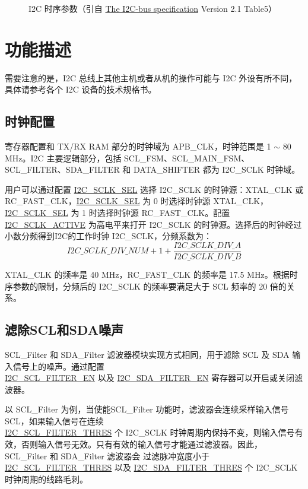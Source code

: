 \documentclass[main\_\_CN.tex]{subfiles}
\begin{document}
\begin{figure}[H]
    \centering
    \caption{I2C 时序参数（引自 \href{https://www.csd.uoc.gr/~hy428/reading/i2c_spec.pdf}{The I2C-bus specification} Version 2.1 Table5）}
    \label{fig:i2c-timing-param}
\end{figure}

\clearpage
\section{功能描述}
需要注意的是，I2C 总线上其他主机或者从机的操作可能与 \chipname{} I2C 外设有所不同，具体请参考各个 I2C 设备的技术规格书。

\subsection{时钟配置}
寄存器配置和 TX/RX RAM 部分的时钟域为 APB\_CLK，时钟范围是 1 $\sim$ 80 MHz。I2C 主要逻辑部分，包括 SCL\_FSM、SCL\_MAIN\_FSM、SCL\_FILTER、SDA\_FILTER 和 DATA\_SHIFTER 都为 I2C\_SCLK 时钟域。

用户可以通过配置 \hyperref[fielddesc:I2CSCLKSEL]{I2C\_SCLK\_SEL} 选择 I2C\_SCLK 的时钟源：XTAL\_CLK 或 RC\_FAST\_CLK，\hyperref[fielddesc:I2CSCLKSEL]{I2C\_SCLK\_SEL} 为 0 时选择时钟源 XTAL\_CLK，\hyperref[fielddesc:I2CSCLKSEL]{I2C\_SCLK\_SEL} 为 1  时选择时钟源 RC\_FAST\_CLK。配置 \hyperref[fielddesc:I2CSCLKACTIVE]{I2C\_SCLK\_ACTIVE} 为高电平来打开 I2C\_SCLK 的时钟源。选择后的时钟经过小数分频得到I2C的工作时钟 I2C\_SCLK，分频系数为：
\[
I2C\_SCLK\_DIV\_ NUM + 1+\frac{ \hyperref[fielddesc:I2CSCLKDIVA]{I2C\_SCLK\_DIV\_A}}{\hyperref[fielddesc:I2CSCLKDIVB]{I2C\_SCLK\_DIV\_B}}
\]

XTAL\_CLK 的频率是 40 MHz，RC\_FAST\_CLK 的频率是 17.5 MHz。根据时序参数的限制，分频后的 I2C\_SCLK 的频率要满足大于 SCL 频率的 20 倍的关系。

\subsection{滤除SCL和SDA噪声}
SCL\_Filter 和 SDA\_Filter 滤波器模块实现方式相同，用于滤除 SCL 及 SDA 输入信号上的噪声。通过配置\\\hyperref[fielddesc:I2CSCLFILTEREN]{I2C\_SCL\_FILTER\_EN} 以及 \hyperref[fielddesc:I2CSDAFILTEREN]{I2C\_SDA\_FILTER\_EN} 寄存器可以开启或关闭滤波器。

以 SCL\_Filter 为例，当使能SCL\_Filter 功能时，滤波器会连续采样输入信号 SCL，如果输入信号在连续 \\\hyperref[fielddesc:I2CSCLFILTERTHRES]{I2C\_SCL\_FILTER\_THRES} 个 I2C\_SCLK 时钟周期内保持不变，则输入信号有效，否则输入信号无效。只有有效的输入信号才能通过滤波器。因此，SCL\_Filter 和 SDA\_Filter 滤波器会
过滤脉冲宽度小于 \hyperref[fielddesc:I2CSCLFILTERTHRES]{I2C\_SCL\_FILTER\_THRES} 以及 \hyperref[fielddesc:I2CSDAFILTERTHRES]{I2C\_SDA\_FILTER\_THRES} 个 I2C\_SCLK 时钟周期的线路毛刺。
\end{document}
